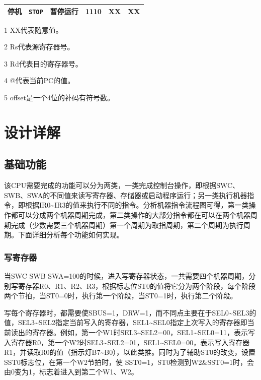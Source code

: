 \documentclass[lang=cn,11pt,a4paper,cite=authornum]{paper}
\begin{document}
\begin{table}[!htbp]
\begin{threeparttable}
\begin{tabular}{|l|l|l|c|c|c|}
        停机 & \texttt{STOP} & 暂停运行 & 1110 & XX & XX \\ \hline
    \end{tabular}
    \begin{tablenotes}
    \footnotesize
        \item[1] XX代表随意值。
        \item[2] Rs代表源寄存器号。
        \item[3] Rd代表目的寄存器号。
        \item[4] @代表当前PC的值。
        \item[5] offset是一个4位的补码有符号数。
    \end{tablenotes}
    \end{threeparttable}
\end{table}

\section{设计详解}

\subsection{基础功能}

该CPU需要完成的功能可以分为两类，一类完成控制台操作，即根据SWC、SWB、SWA的不同值来读写寄存器、存储器或启动程序运行；另一类执行机器指令，即根据IR0\textasciitilde IR3的值来执行不同的指令。分析机器指令流程图可得，第一类操作都可以分成两个机器周期完成，第二类操作的大部分指令都在可以在两个机器周期完成（少数需要三个机器周期）第一个周期为取指周期，第二个周期为执行周期。下面详细分析每个功能如何实现。

\subsubsection{写寄存器}

当SWC SWB SWA=100的时候，进入写寄存器状态，一共需要四个机器周期，分别写寄存器R0、R1、R2、R3，根据标志位ST0的值将它分为两个阶段，每个阶段两个节拍，当ST0=0时，执行第一个阶段，当ST0=1时，执行第二个阶段。

写每个寄存器时，都需要使SBUS=1，DRW=1，而不同点主要在于SEL0\textasciitilde SEL3的值，SEL3\textasciitilde SEL2指定当前写入的寄存器，SEL1\textasciitilde SEL0指定上次写入的寄存器即当前读出的寄存器。例如，第一个W1时SEL3\textasciitilde SEL2=00，SEL1\textasciitilde SEL0=11，表示写入寄存器R0，第一个W2时SEL3\textasciitilde SEL2=01，SEL1\textasciitilde SEL0=00，表示写入寄存器R1，并读取R0的值（指示灯B7\textasciitilde B0），以此类推。同时为了辅助ST0的改变，设置SST0标志位，在第一个W2节拍时，使 SST0=1，ST0检测到W2\&SST0=1时，会由0变为1，标志着进入到第二个W1、W2。
\end{document}
